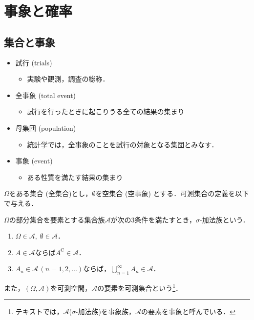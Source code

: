 \documentclass{jsreport}
\begin{document}
\chapter{事象と確率}
\section{集合と事象}
\begin{itemize}
  \item 試行 (trials)
  \begin{itemize}
    \item 実験や観測，調査の総称．
  \end{itemize}
  \item 全事象 (total event)
  \begin{itemize}
    \item 試行を行ったときに起こりうる全ての結果の集まり
  \end{itemize}
  \item 母集団 (population)
  \begin{itemize}
    \item 統計学では，全事象のことを試行の対象となる集団とみなす．
  \end{itemize}
  \item 事象 (event)
  \begin{itemize}
    \item ある性質を満たす結果の集まり
  \end{itemize}
\end{itemize}

$\Omega$をある集合 (全集合)とし，$\emptyset$を空集合 (空事象) とする．可測集合の定義を以下で与える．
\begin{screen}
  \begin{defi}
    $\Omega$の部分集合を要素とする集合族$\mathscr{A}$が次の3条件を満たすとき，$\sigma$-加法族という．
    \begin{enumerate}
      \item $\Omega \in \mathscr{A}, \; \emptyset \in \mathscr{A}$．
      \item $A \in \mathscr{A}$ならば$A^{\mathrm{C}} \in \mathscr{A}$．
      \item $A_n \in \mathscr{A} \, (n = 1, 2, \ldots)$ならば，$\bigcup_{n = 1}^{\infty} A_n \in \mathscr{A}$．
    \end{enumerate}
  \end{defi}
\end{screen}
また，$(\Omega, \mathscr{A})$を可測空間，$\mathscr{A}$の要素を可測集合という\footnote{テキストでは，$\mathscr{A}$($\sigma$-加法族)を事象族，$\mathscr{A}$の要素を事象と呼んでいる．}．
\end{document}
